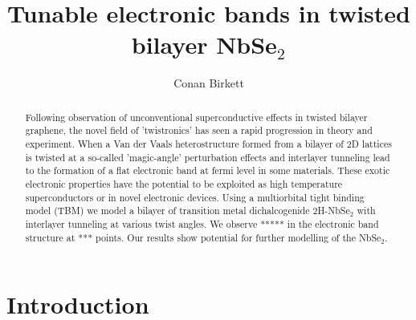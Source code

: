 \documentclass[12pt]{report} %
\title{\textbf{Tunable electronic bands in twisted bilayer NbSe$_2$}}
\author{Conan Birkett}
\affil{Department of Physics, University of Bath, Bath BA2 7AY, United Kingdom}
\begin{document}
\maketitle
\begin{abstract}
  Following observation of unconventional superconductive effects in twisted bilayer graphene, the novel field of 'twistronics' has seen a rapid progression in theory and experiment. When a Van der Vaals heterostructure formed from a bilayer of 2D lattices is twisted at a so-called 'magic-angle' perturbation effects and interlayer tunneling lead to the formation of a flat electronic band at fermi level in some materials. These exotic electronic properties have the potential to be exploited as high temperature superconductors or in novel electronic devices. Using a multiorbital tight binding model (TBM) we model a bilayer of transition metal dichalcogenide 2H-NbSe$_2$ with interlayer tunneling at various twist angles. We observe ***** in the electronic band structure at *** points. Our results show potential for further modelling of the NbSe$_2$.
\end{abstract}

\newpage

\section*{Introduction}
\end{document}
